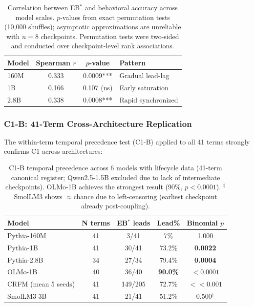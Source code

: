 \documentclass[10pt]{article} %
\begin{document}
\begin{table}[h]
\centering
\begin{tabular}{|l|c|c|l|}
\hline
\textbf{Model} & \textbf{Spearman $r$} & \textbf{$p$-value} & \textbf{Pattern} \\
\hline
160M & 0.333 & 0.0009*** & Gradual lead-lag \\
1B & 0.166 & 0.107 (ns) & Early saturation \\
2.8B & 0.338 & 0.0008*** & Rapid synchronized \\
\hline
\end{tabular}
\caption{Correlation between EB$^*$ and behavioral accuracy across model scales. $p$-values from exact permutation tests (10{,}000 shuffles); asymptotic approximations are unreliable with $n=8$ checkpoints. Permutation tests were two-sided and conducted over checkpoint-level rank associations.}
\label{tab:ebstar_behavior_corr}
\end{table}

\subsubsection{C1-B: 41-Term Cross-Architecture Replication}

The within-term temporal precedence test (C1-B) applied to all 41 terms strongly confirms C1 across architectures:

\begin{table}[h]
\centering
\small
\begin{tabular}{|l|c|c|c|c|}
\hline
\textbf{Model} & \textbf{N terms} & \textbf{EB$^*$ leads} & \textbf{Lead\%} & \textbf{Binomial $p$} \\
\hline
Pythia-160M & 41 & 3/41 & 7\% & 1.000 \\
Pythia-1B & 41 & 30/41 & 73.2\% & \textbf{0.0022} \\
Pythia-2.8B & 34 & 27/34 & 79.4\% & \textbf{0.0004} \\
OLMo-1B & 40 & 36/40 & \textbf{90.0\%} & $\mathbf{<0.0001}$ \\
CRFM (mean 5 seeds) & 41 & 149/205 & 72.7\% & $\mathbf{<<0.001}$ \\
SmolLM3-3B & 41 & 21/41 & 51.2\% & 0.500$^\ddagger$ \\
\hline
\end{tabular}
\caption{C1-B temporal precedence across 6 models with lifecycle data (41-term canonical register; Qwen2.5-1.5B excluded due to lack of intermediate checkpoints). OLMo-1B achieves the strongest result (90\%, $p<0.0001$). $^\ddagger$SmolLM3 shows $\approx$chance due to left-censoring (earliest checkpoint already post-coupling).}
\label{tab:c1b_temporal}
\end{table}
\end{document}
